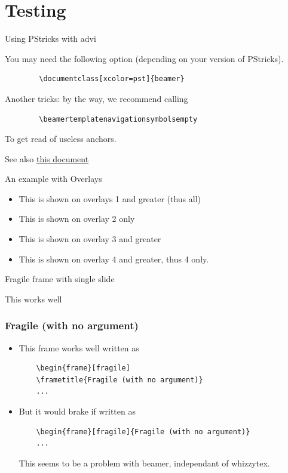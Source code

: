 \documentclass{beamer}
\begin{document}
\section{Testing}
\begin{frame}[fragile=singleslide]{Using PStricks with advi}

You may need the following option (depending on your version of PStricks).
\begin{verbatim}
        \documentclass[xcolor=pst]{beamer}
\end{verbatim}

Another tricks: by the way, we recommend calling
\begin{verbatim}
        \beamertemplatenavigationsymbolsempty
\end{verbatim}
To get read of useless anchors.

See also
\href{http://www.giref.ulaval.ca/~ctibirna/work/readings/beamer_pstricks.pdf}
{this document}
\end{frame}
\begin{frame}{An example with Overlays}
\begin{itemize}
\item<1-> This is shown on overlays 1 and greater (thus all)
\item<2> This is shown on overlay 2 only
\item<3-> This is shown on overlay 3 and greater
\item<4-> This is shown on overlay 4 and greater, thus  4 only.
\end{itemize}
\end{frame}
\begin{frame}[fragile=singleslide]{Fragile frame with single slide}

This works well
\end{frame}
\begin{frame}[fragile]
\frametitle{Fragile (with no argument)}
\begin{itemize}

\item <1->
This frame works well written as
 \begin{verbatim}
    \begin{frame}[fragile]
    \frametitle{Fragile (with no argument)}
    ...
\end{verbatim}
\item <2->
But it would brake if written as
 \begin{verbatim}
    \begin{frame}[fragile]{Fragile (with no argument)}
    ...
\end{verbatim}
This seems to be a problem with beamer, independant of whizzytex.
\end{itemize}
\end{frame}
\end{document}
